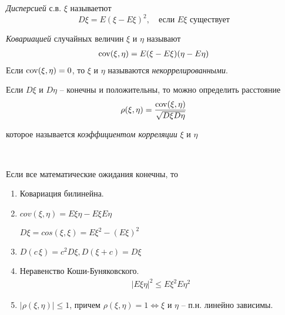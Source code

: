 
\begin{definition}
  \emph{Дисперсией} с.в. $\xi$ называетют
  \begin{equation*}
    D\xi = E(\xi - E\xi)^2, \quad \text{если $E\xi$ существует}
  \end{equation*}
\end{definition}

\begin{definition}
  \emph{Ковариацией} случайных величин $\xi$ и $\eta$ называют
  \begin{align*}
    \operatorname{cov}(\xi, \eta) = E(\xi - E\xi) (\eta - E\eta)
  \end{align*}
  Если $\operatorname{cov}(\xi, \eta) = 0$, то $\xi$ и $\eta$ называются \emph{некоррелированными}.
\end{definition}

Если $D\xi$ и $D\eta$ -- конечны и положительны, то можно определить расстояние
\begin{align*}
  \rho(\xi, \eta) = \frac{\operatorname{cov}(\xi, \eta)}{\sqrt{D \xi D \eta}}
\end{align*}

которое называется \emph{коэффициентом корреляции} $\xi$ и $\eta$

\begin{lemma}~

  Если все математические ожидания конечны, то 
  \begin{enumerate}
    \item 
      Ковариация билинейна.

    \item 
      $cov(\xi, \eta) = E \xi \eta - E\xi E\eta$

      $D\xi = cos(\xi, \xi) = E\xi^2 - (E \xi)^2$

    \item 
      $D(c\, \xi) = c^2 D \xi, D(\xi + c) = D \xi$

    \item 
      Неравенство Коши-Буняковского.
      \begin{align*}
        |E\xi \eta|^2 \leq E\xi^2 E\eta^2
      \end{align*}

    \item 
      $|\rho(\xi, \eta)| \leq 1$, 
      причем $\rho(\xi, \eta) = 1 \Leftrightarrow \xi$ и $\eta$ -- п.н. линейно зависимы.
  \end{enumerate}

\end{lemma}

